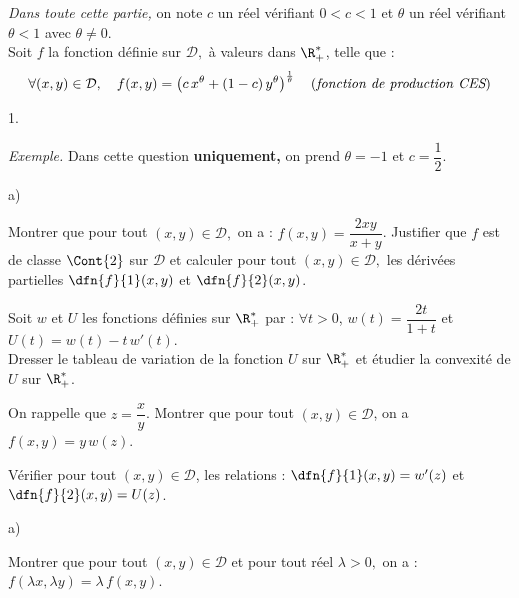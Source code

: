 \noindent
{\it Dans toute cette partie,} on note $c$ un réel vérifiant $0<c<1$ et 
$\theta$ un réel vérifiant $\theta < 1$ avec $\theta \neq 0.$\\
Soit $f$ la fonction définie sur $\mathcal{D},$ à valeurs dans 
$\R_+^*$, telle que :
\[
\forall (x,y)\in \mathcal{D},\quad 
f(x,y)=\left(c \, x^\theta+(1-c) \, y^\theta\right)^{\frac{1}{\theta}} 
\quad \text{({\it fonction de production CES})}
\]
\begin{noliste}{1.}
 \setlength{\itemsep}{4mm}
 \item {\it Exemple.} Dans cette question \textbf{uniquement,} on prend 
 $\theta=-1$ et $c=\dfrac{1}{2}$.
 \begin{noliste}{a)}
  \setlength{\itemsep}{2mm}
  \item Montrer que pour tout $(x,y) \in \mathcal{D},$ on a : $f(x,y) = 
  \dfrac{2xy}{x+y}$. Justifier que $f$ est de classe $\Cont{2}$ sur 
  $\mathcal{D}$ et calculer pour tout $(x,y) \in \mathcal{D},$ les 
  dérivées partielles $\dfn{f}{1}(x,y)$ et $\dfn{f}{2}(x,y)$.
  
  
  
  
  
  
  
  \newpage
  
  

  
  \item Soit $w$ et $U$ les fonctions définies sur $\R_+^*$ par :
  $\forall t > 0$, $w(t)=\dfrac{2t}{1+t}$ et $U(t)=w(t)-t \, w'(t).$\\
  Dresser le tableau de variation de la fonction $U$ sur $\R_+^*$ et 
  étudier la convexité de $U$ sur $\R_+^*$.
  
  
  
  \item On rappelle que $z=\dfrac{x}{y}$. Montrer que pour tout $(x,y) 
  \in \mathcal{D}$, on a $f(x,y)=y \, w(z)$.
  
  

  
  \item Vérifier pour tout $(x,y) \in \mathcal{D}$, les relations : 
  $\dfn{f}{1}(x,y)=w'(z)$ et $\dfn{f}{2}(x,y)=U(z)$.
  
  
 \end{noliste}
 
 
 
 
 
 
 
 
 

 \item 
 \begin{noliste}{a)}
  \setlength{\itemsep}{2mm}
  \item Montrer que pour tout $(x,y) \in \mathcal{D}$ et pour tout réel 
  $\lambda >0,$ on a : $f(\lambda x,\lambda y)=\lambda \, f(x,y)$.
  

\end{noliste}
\end{noliste}

